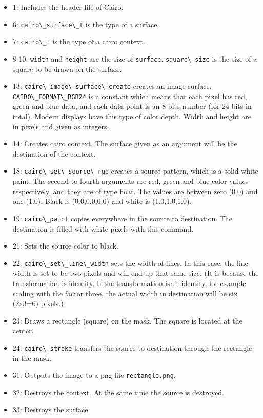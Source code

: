 \begin{itemize}
\tightlist
\item
  1: Includes the header file of Cairo.
\item
  6: \passthrough{\lstinline!cairo\_surface\_t!} is the type of a
  surface.
\item
  7: \passthrough{\lstinline!cairo\_t!} is the type of a cairo context.
\item
  8-10: \passthrough{\lstinline!width!} and
  \passthrough{\lstinline!height!} are the size of
  \passthrough{\lstinline!surface!}.
  \passthrough{\lstinline!square\_size!} is the size of a square to be
  drawn on the surface.
\item
  13: \passthrough{\lstinline!cairo\_image\_surface\_create!} creates an
  image surface. \passthrough{\lstinline!CAIRO\_FORMAT\_RGB24!} is a
  constant which means that each pixel has red, green and blue data, and
  each data point is an 8 bits number (for 24 bits in total). Modern
  displays have this type of color depth. Width and height are in pixels
  and given as integers.
\item
  14: Creates cairo context. The surface given as an argument will be
  the destination of the context.
\item
  18: \passthrough{\lstinline!cairo\_set\_source\_rgb!} creates a source
  pattern, which is a solid white paint. The second to fourth arguments
  are red, green and blue color values respectively, and they are of
  type float. The values are between zero (0.0) and one (1.0). Black is
  (0.0,0.0,0.0) and white is (1.0,1.0,1.0).
\item
  19: \passthrough{\lstinline!cairo\_paint!} copies everywhere in the
  source to destination. The destination is filled with white pixels
  with this command.
\item
  21: Sets the source color to black.
\item
  22: \passthrough{\lstinline!cairo\_set\_line\_width!} sets the width
  of lines. In this case, the line width is set to be two pixels and
  will end up that same size. (It is because the transformation is
  identity. If the transformation isn't identity, for example scaling
  with the factor three, the actual width in destination will be six
  (2x3=6) pixels.)
\item
  23: Draws a rectangle (square) on the mask. The square is located at
  the center.
\item
  24: \passthrough{\lstinline!cairo\_stroke!} transfers the source to
  destination through the rectangle in the mask.
\item
  31: Outputs the image to a png file
  \passthrough{\lstinline!rectangle.png!}.
\item
  32: Destroys the context. At the same time the source is destroyed.
\item
  33: Destroys the surface.
\end{itemize}


